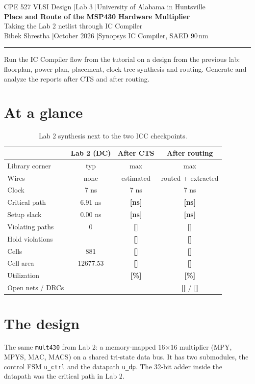 \documentclass[11pt,a4paper]{article}
\newcommand{\fillin}[1]{\textcolor{badred}{\textbf{[#1]}}}
\newcommand{\header}[3]{%
  \begin{center}
  {\small\color{cm} CPE 527 VLSI Design \quad|\quad Lab 3 \quad|\quad University of Alabama in Huntsville}\\[8pt]
  {\LARGE\bfseries\color{accent} #1}\\[4pt]
  {\large #2}\\[8pt]
  {\small Bibek Shrestha \quad|\quad October 2026 \quad|\quad #3}
  \end{center}\vspace{2pt}\hrule\vspace{6pt}}
\begin{document}
\header{Place and Route of the MSP430 Hardware Multiplier}{Taking the Lab 2 netlist through IC Compiler}{Synopsys IC Compiler, SAED 90\,nm}

\begin{task}
Run the IC Compiler flow from the tutorial on a design from the previous lab: floorplan, power plan,
placement, clock tree synthesis and routing. Generate and analyze the reports after CTS and after routing.
\end{task}

\section*{At a glance}
\begin{table}[H]\centering\small
\begin{tabular}{lccc}
\toprule
 & \textbf{Lab 2 (DC)} & \textbf{After CTS} & \textbf{After routing} \\
\midrule
Library corner & typ & max & max \\
Wires & none & estimated & routed + extracted \\
Clock & 7 ns & 7 ns & 7 ns \\
Critical path & 6.91 ns & \fillin{ns} & \fillin{ns} \\
Setup slack & 0.00 ns & \fillin{ns} & \fillin{ns} \\
Violating paths & 0 & \fillin{} & \fillin{} \\
Hold violations & & \fillin{} & \fillin{} \\
Cells & 881 & \fillin{} & \fillin{} \\
Cell area & 12677.53 & \fillin{} & \fillin{} \\
Utilization & & \fillin{\%} & \fillin{\%} \\
Open nets / DRCs & & & \fillin{} / \fillin{} \\
\bottomrule
\end{tabular}
\caption{Lab 2 synthesis next to the two ICC checkpoints.}
\end{table}

\section{The design}
The same \texttt{mult430} from Lab 2: a memory-mapped 16$\times$16 multiplier (MPY, MPYS, MAC, MACS) on a
shared tri-state data bus. It has two submodules, the control FSM \texttt{u\_ctrl} and the datapath \texttt{u\_dp}.
The 32-bit adder inside the datapath was the critical path in Lab 2.
\end{document}
